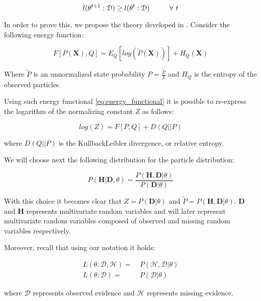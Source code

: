 \documentclass[11pt]{article}
\begin{document}
\begin{article}
\begin{theorem}
$$l(\theta^{t+1} : \mathcal{D}) \geq l(\theta^{t} : \mathcal{D}) \hspace*{1cm} \forall \ t$$
\end{theorem}

In order to prove this, we propose the theory developed in
\cite{koller2009probabilistic}. Consider the following energy
function:

\begin{equation} \label{eq:energy_functional}
F[P(\textbf{X}), Q] = E_Q[log (\tilde{P}(\textbf{X}))] + H_Q (\textbf{X})
\end{equation}

Where \(\tilde{P}\) is an unnormalized state probability \(P =
   \frac{\tilde{P}}{Z}\) and \(H_Q\) is the entropy of the observed
particles. 

Using such energy functional \ref{eq:energy_functional} it is possible
to re-express the logarithm of the normalizing constant \(Z\) as
follows:

\begin{equation} \label{eq:energy_refurmolation}
log (Z) = F[P, Q] + D (Q||P)
\end{equation}

where $D(Q||P)$ is the Kullback\textendash Leibler divergence, or relative
entropy.

We will choose next the following distribution for the particle
distribution:

\begin{equation} \label{eq:particle_distribution}
P (\textbf{H} | \textbf{D}, \theta) =   \frac{P (\textbf{H}, \textbf{D}| \theta)}{P (\textbf{D}| \theta)}
\end{equation}

With this choice it becomes clear that \(Z = P (\textbf{D}| \theta)\)
and \(\tilde{P} = P (\textbf{H}, \textbf{D}| \theta)\). \textbf{D}
and \textbf{H} represents multivariate random variables and will
later represent multivariate random variables composed of observed
and missing random variables respectively.

Moreover, recall that using our notation it holds:

\begin{align} \label{eq:likelihood_particle}
L (\theta: \mathcal{D}, \mathcal{H}) =& \  P (\mathcal{H}, \mathcal{D}| \theta)\\
L (\theta: \mathcal{D}) =& \ P (\mathcal{D}| \theta)
\end{align}

where \(\mathcal{D}\) represents observed evidence and \(\mathcal{H}\)
represents missing evidence.


\end{article}
\end{document}
